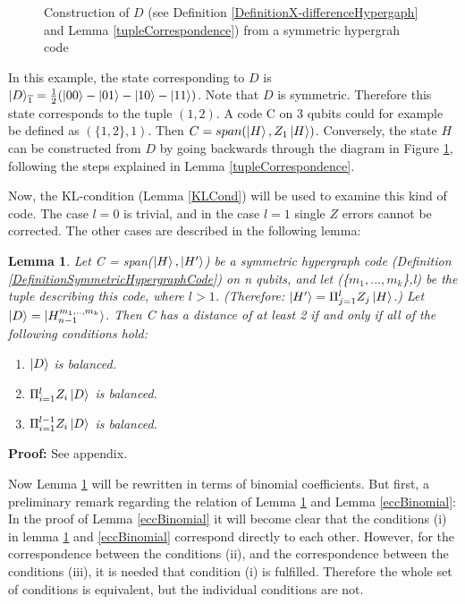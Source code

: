 \documentclass[12pt]{iopart}
\newtheorem{lemma}{Lemma}
\begin{document}
\begin{figure}[H]
{{
}
}
\caption{Construction of $D$ (see Definition \ref{DefinitionX-differenceHypergaph} and Lemma \ref{tupleCorrespondence}) from a symmetric hypergrah code}
\label{TupleConstructionFigure}
\end{figure}

In this example, the state corresponding to $D$ is $\ket{D}_{\overline{1}} = \frac{1}{2}(\ket{00}-\ket{01}-\ket{10}-\ket{11})$. Note that $D$ is symmetric. Therefore this state corresponds to the tuple $(1,2)$. A code C on 3 qubits could for example be defined as $(\{1,2\},1)$. Then $C = span(\ket{H},Z_1\ket{H})$. 
Conversely, the state $H$ can be constructed from $D$ by going backwards through the diagram in Figure \ref{TupleConstructionFigure}, following the steps explained in Lemma \ref{tupleCorrespondence}.

Now, the KL-condition (Lemma \ref{KLCond}) will be used to examine this kind of code. The case $l = 0 $ is trivial, and in the case $l = 1$ single $Z$ errors cannot be corrected. The other cases are described in the following lemma:

\begin{lemma}
\label{ecc}
Let C = span($\ket{H},\ket{H^\prime}$) be a symmetric hypergraph code (Definition \ref{DefinitionSymmetricHypergraphCode}) on n qubits, and let (\{$m_1,...,m_k$\},l) be the tuple describing this code, where $l>1$. (Therefore: $\ket{H^\prime} = \Pi_{j=1}^l Z_j \ket{H}$.) Let $\ket{D} = \ket{H^{m_1,..,m_k}_{n-1}}$.
Then C has a distance of at least 2 if and only if all of the following conditions hold:

\begin{enumerate}
\item $\ket{D}$ is balanced.
\item $\Pi_{i=1}^l Z_i\ket{D}$ is balanced.
\item $\Pi_{i=1}^{l-1}Z_i\ket{D}$ is balanced.
\end{enumerate}
\end{lemma}
\textbf{Proof:} See appendix.

Now Lemma \ref{ecc} will be rewritten in terms of binomial coefficients. 
But first, a preliminary remark regarding the relation of Lemma \ref{ecc} and Lemma \ref{eccBinomial}:
In the proof of Lemma \ref{eccBinomial} it will become clear that the conditions (i) in lemma \ref{ecc} and \ref{eccBinomial} correspond directly to each other. However, for the correspondence between the conditions (ii), and the correspondence between the conditions (iii), it is needed that condition (i) is fulfilled. Therefore the whole set of conditions is equivalent, but the individual conditions are not.
\end{document}
